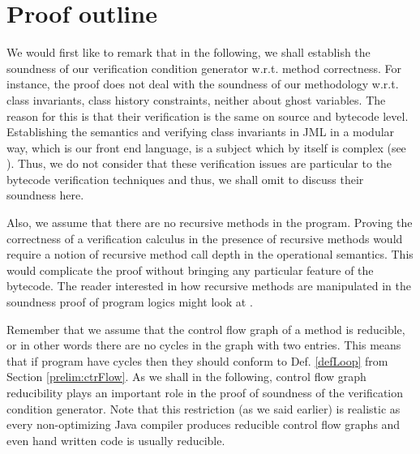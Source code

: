 \section{Proof outline} \label{proof:outline}
 We would first like to remark that in the following, we shall establish the soundness of our verification condition generator
 w.r.t. method correctness. For instance, the proof does not deal with the soundness of our
 methodology w.r.t. class invariants, class history constraints, neither about ghost variables. The reason for
 this is that their verification is the same on source and bytecode level. Establishing the semantics and 
 verifying class invariants in JML in a modular way, which is our front end language, is a subject which  by itself
 is complex (see \cite{barnett03verification}). Thus,  we do not consider that these verification issues are particular
 to the bytecode verification  techniques and thus, we shall omit to discuss their soundness here. 

Also, we assume that there are no recursive methods in the program. 
Proving the correctness of a verification calculus in the presence 
of recursive methods would require a notion of recursive method call depth in the operational
semantics. This would complicate the proof without bringing any particular feature of the bytecode.
The reader interested in how recursive methods are manipulated in the soundness proof
of program logics might look at \cite{Nipkow-MOD2001}.  

Remember that we assume that the control flow graph of a method is reducible, or in other words there 
are no cycles in the graph with two entries. This means that if program have cycles then they should 
conform to Def. \ref{defLoop} from Section \ref{prelim:ctrFlow}.
As we shall in the following, control flow graph reducibility plays an important role in
 the proof of soundness of the verification condition generator. 
Note that this restriction (as we said earlier) is realistic as every non-optimizing Java compiler produces
reducible control flow graphs and even hand written code is usually reducible.


